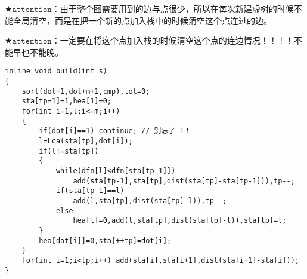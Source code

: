 $\bigstar\texttt{attention}$：由于整个图需要用到的边与点很少，所以在每次新建虚树的时候不能全局清空，而是在把一个新的点加入栈中的时候清空这个点连过的边。

$\bigstar\texttt{attention}$：一定要在将这个点加入栈的时候清空这个点的连边情况！！！！不能早也不能晚。

\begin{verbatim}
inline void build(int s)
{
    sort(dot+1,dot+m+1,cmp),tot=0;
    sta[tp=1]=1,hea[1]=0;
    for(int i=1,l;i<=m;i++)
    {
        if(dot[i]==1) continue; // 别忘了 1！ 
        l=Lca(sta[tp],dot[i]);
        if(l!=sta[tp])
        {
            while(dfn[l]<dfn[sta[tp-1]])
                add(sta[tp-1],sta[tp],dist(sta[tp]-sta[tp-1])),tp--;
            if(sta[tp-1]==l)
                add(l,sta[tp],dist(sta[tp]-l)),tp--;
            else
                hea[l]=0,add(l,sta[tp],dist(sta[tp]-l)),sta[tp]=l;
        }
        hea[dot[i]]=0,sta[++tp]=dot[i];
    }
    for(int i=1;i<tp;i++) add(sta[i],sta[i+1],dist(sta[i+1]-sta[i]));
}
\end{verbatim}